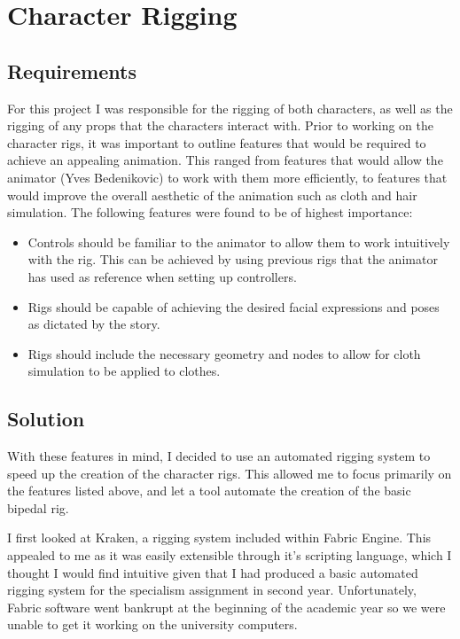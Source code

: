 \documentclass[11pt]{article}
\begin{document}
\section{Character Rigging}

\subsection{Requirements}

For this project I was responsible for the rigging of both characters, as well as the rigging of any props that the characters interact with. Prior to working on the character rigs, it was important to outline features that would be required to achieve an appealing animation. This ranged from features that would allow the animator (Yves Bedenikovic) to work with them more efficiently, to features that would improve the overall aesthetic of the animation such as cloth and hair simulation. The following features were found to be of highest importance:

\begin{itemize}

\item Controls should be familiar to the animator to allow them to work intuitively with the rig. This can be achieved by using previous rigs that the animator has used as reference when setting up controllers.

\item Rigs should be capable of achieving the desired facial expressions and poses as dictated by the story.

\item Rigs should include the necessary geometry and nodes to allow for cloth simulation to be applied to clothes.

\end{itemize}

\subsection{Solution}

With these features in mind, I decided to use an automated rigging system to speed up the creation of the character rigs. This allowed me to focus primarily on the features listed above, and let a tool automate the creation of the basic bipedal rig.

I first looked at Kraken\cite{kraken}, a rigging system included within Fabric Engine. This appealed to me as it was easily extensible through it's scripting language, which I thought I would find intuitive given that I had produced a basic automated rigging system for the specialism assignment in second year. Unfortunately, Fabric software went bankrupt at the beginning of the academic year so we were unable to get it working on the university computers.
\end{document}
